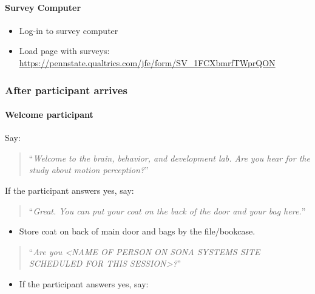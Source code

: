 \documentclass[]{article}
\providecommand{\tightlist}{%
  \setlength{\itemsep}{0pt}\setlength{\parskip}{0pt}}
\let\oldparagraph\paragraph
\renewcommand{\paragraph}[1]{\oldparagraph{#1}\mbox{}}
\begin{document}
\hypertarget{survey-computer}{%
\paragraph{Survey Computer}\label{survey-computer}}

\begin{itemize}
\tightlist
\item
  Log-in to survey computer
\item
  Load page with surveys:
  \url{https://pennstate.qualtrics.com/jfe/form/SV_1FCXbmrfTWprQON}
\end{itemize}

\hypertarget{after-participant-arrives}{%
\subsubsection{After participant
arrives}\label{after-participant-arrives}}

\hypertarget{welcome-participant}{%
\paragraph{Welcome participant}\label{welcome-participant}}

Say:

\begin{quote}
``\emph{Welcome to the brain, behavior, and development lab. Are you
hear for the study about motion perception?}''
\end{quote}

If the participant answers yes, say:

\begin{quote}
``\emph{Great. You can put your coat on the back of the door and your
bag here.}''
\end{quote}

\begin{itemize}
\tightlist
\item
  Store coat on back of main door and bags by the file/bookcase.
\end{itemize}

\begin{quote}
``\emph{Are you \textless{}NAME OF PERSON ON SONA SYSTEMS SITE SCHEDULED
FOR THIS SESSION\textgreater{}?}''
\end{quote}

\begin{itemize}
\tightlist
\item
  If the participant answers yes, say:
\end{itemize}
\end{document}
